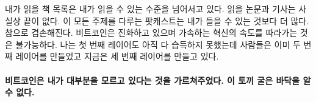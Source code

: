 내가 읽을 책 목록은 내가 읽을 수 있는 수준을 넘어서고 있다. 
읽을 논문과 기사는 사실상 끝이 없다.
이 모든 주제를 다루는 팟캐스트는 내가 들을 수 있는 것보다 더 많다. 
참으로 겸손해진다.
비트코인은 진화하고 있으며 가속하는 혁신의 속도를 따라가는 것은 불가능하다. 
나는 첫 번째 레이어도 아직 다 습득하지 못했는데 
사람들은 이미 두 번째 레이어를 만들었고 지금은 세 번째 레이어를 만들고 있다.


\paragraph{비트코인은 내가 대부분을 모르고 있다는 것을 가르쳐주었다. 이 토끼 굴은 바닥을 알 수 없다.}

%
%
%
%
%
